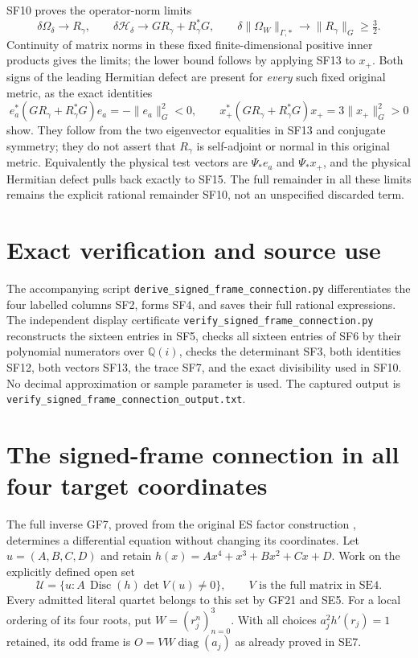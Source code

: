 SF10 proves the operator-norm limits
\begin{equation}
 \delta\Omega_\delta\longrightarrow R_\gamma,
 \qquad
 \delta\mathscr H_\delta\longrightarrow
       G R_\gamma+R_\gamma^*G,
 \qquad
 \delta\|\Omega_W\|_{\Gamma,*}
       \longrightarrow\|R_\gamma\|_G\ge\tfrac32.
 \tag{SF17}
\end{equation}
Continuity of matrix norms in these fixed finite-dimensional
positive inner products gives the limits; the lower bound
follows by applying SF13 to $x_+$. Both signs of the leading
Hermitian defect are present for \emph{every} such fixed
original metric, as the exact identities
\begin{equation}
 e_a^*(G R_\gamma+R_\gamma^*G)e_a=-\|e_a\|_G^2<0,
 \qquad
 x_+^*(G R_\gamma+R_\gamma^*G)x_+=3\|x_+\|_G^2>0
 \tag{SF18}
\end{equation}
show. They follow from the two eigenvector equalities in SF13
and conjugate symmetry; they do not assert that $R_\gamma$
is self-adjoint or normal in this original metric. Equivalently
the physical test vectors are $\Psi_*e_a$ and $\Psi_*x_+$,
and the physical Hermitian defect pulls back exactly to SF15.
The full remainder in all these limits remains the explicit
rational remainder SF10, not an unspecified discarded term.

\section{Exact verification and source use}
The accompanying script
\texttt{derive\_signed\_frame\_connection.py} differentiates
the four labelled columns SF2, forms SF4, and saves their full
rational expressions. The independent display certificate
\texttt{verify\_signed\_frame\_connection.py} reconstructs
the sixteen entries in SF5, checks all sixteen entries of
SF6 by their polynomial numerators over $\mathbb Q(i)$,
checks the determinant SF3, both identities SF12, both vectors
SF13, the trace SF7, and the exact divisibility used in SF10.
No decimal approximation or sample parameter is used.
The captured output is
\texttt{verify\_signed\_frame\_connection\_output.txt}.

\section{The signed-frame connection in all four target coordinates}
The full inverse GF7, proved from the original ES factor construction
\cite{fullfable:ES488,fullfable:ES}, determines a differential equation without changing its
coordinates. Let $u=(A,B,C,D)$ and retain
$h(x)=Ax^4+x^3+Bx^2+Cx+D$. Work on the explicitly defined open set
\[
 \mathcal U=\{u:A\,\operatorname{Disc}(h)\det V(u)\ne0\},
 \qquad V\text{ is the full matrix in SE4}.
 \tag{SC1}
\]
Every admitted literal quartet belongs to this set by GF21 and SE5.
For a local ordering of its four roots, put $W=(r_j^n)_{n=0}^3$.
With all choices $a_j^2h'(r_j)=1$ retained, its odd frame is
$O=VW\operatorname{diag}(a_j)$ as already proved in SE7.

